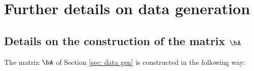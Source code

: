 \documentclass[11pt]{amsart}
\begin{document}



\section{Further details on data generation}

\subsection{Details on the construction of the matrix $\bA$} \label{app: construction of A}

The matrix $\bA$ of Section \ref{sec: data gen} is constructed in the following way:
\end{document}
